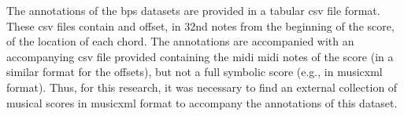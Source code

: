 

The annotations of the \gls{bps} datasets are provided in a
tabular \gls{csv} file format. These \gls{csv} files contain
and offset, in 32nd notes from the beginning of the score,
of the location of each chord. The annotations are
accompanied with an accompanying \gls{csv} file provided
containing the midi \gls{midi} notes of the score (in a
similar format for the offsets), but not a full symbolic
score (e.g., in \gls{musicxml} format). Thus, for this
research, it was necessary to find an external collection of
musical scores in \gls{musicxml} format to accompany the
annotations of this dataset.